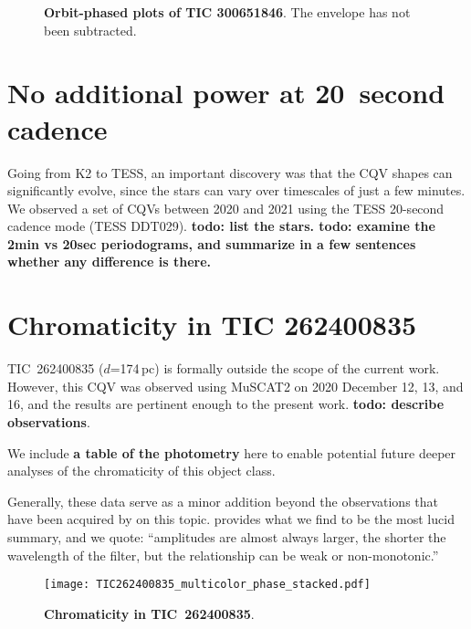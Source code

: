 \documentclass[11pt,twocolumn,tighten]{aastex63}
\begin{document}
\begin{figure*}[!t]
	\begin{center}
	\end{center}
	\vspace{-0.4cm}
	\caption{
		{\bf Orbit-phased plots of TIC 300651846}.
		The envelope has not been subtracted.
	}
	\label{fig:tic3006timegroups}
\end{figure*}



\section{No additional power at 20~second cadence}

Going from K2 to TESS, an important discovery was that the CQV shapes
can significantly evolve, since the stars can vary over timescales of just a few minutes.
We observed a set of CQVs between 2020 and 2021 using the TESS 20-second
cadence mode (TESS DDT029).
{\bf todo: list the stars.  todo: examine the 2min vs 20sec periodograms, and summarize in a few
sentences whether any difference is there.}



\section{Chromaticity in TIC 262400835}

TIC~262400835 ($d$=174\,pc) is formally outside the scope of the
current work.  However, this CQV was observed using MuSCAT2 on 2020
December 12, 13, and 16, and the results are pertinent enough to the
present work.
{\bf todo: describe observations}.

We include {\bf a table of the photometry} here to enable potential
future deeper analyses of the chromaticity of this object class.

Generally, these data serve as a minor addition beyond the
observations that have been acquired by
\citet[e.g.][]{2017PASJ...69L...2O,2020PASJ...72...23T,2022AJ....163..144G,2023MNRAS.518.2921K}
on this topic.  \citet{2023MNRAS.518.2921K} provides what we find to
be the most lucid summary, and we quote: ``amplitudes are almost
always larger, the shorter the wavelength of the filter, but the
relationship can be weak or non-monotonic.''

\begin{figure*}[!t]
	\begin{center}
    \texttt{[image: TIC262400835\_multicolor\_phase\_stacked.pdf]}
    	\end{center}
    \vspace{-0.4cm}
		\caption{
	      {\bf Chromaticity in TIC~262400835}.
		}
		\label{fig:muscat}
\end{figure*}



\clearpage
\listofchanges
\end{document}
